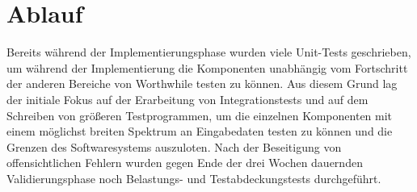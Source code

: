 \section{Ablauf}

Bereits während der Implementierungsphase wurden viele Unit-Tests geschrieben, um während der Implementierung die Komponenten unabhängig vom Fortschritt der anderen Bereiche von Worthwhile testen zu können. Aus diesem Grund lag der initiale Fokus auf der Erarbeitung von Integrationstests und auf dem Schreiben von größeren Testprogrammen, um die einzelnen Komponenten mit einem möglichst breiten Spektrum an Eingabedaten testen zu können und die Grenzen des Softwaresystems auszuloten. Nach der Beseitigung von offensichtlichen Fehlern wurden gegen Ende der drei Wochen dauernden Validierungsphase noch Belastungs- und Testabdeckungstests durchgeführt.

